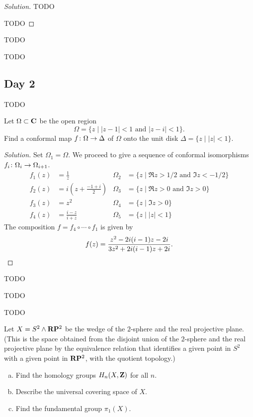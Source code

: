 \begin{proof}[Solution]
  TODO
  
  TODO
\end{proof}


TODO


TODO

\subsection{Day 2}
\label{S:fall-2008-2}
\mbox{}


TODO


Let $\Omega \subset \mathbf{C}$ be the open region
\[
\Omega = \{ z \;|\; |z-1| < 1 \textrm{ and } |z-i| < 1 \}.
\]
Find a conformal map $f \colon \Omega \rightarrow \Delta$ of $\Omega$ onto the unit disk $\Delta = \{ z \;|\; |z| < 1 \}$.

\begin{proof}[Solution]
  Set $\Omega_1 = \Omega$. We proceed to give a sequence of conformal isomorphisms $f_i \colon \Omega_i \rightarrow \Omega_{i+1}$.
  \begin{align*}
    f_1(z) &= \frac{1}{z} &
    \Omega_2 &= \{ z \;|\; \Re z > 1/2 \textrm{ and } \Im z < -1/2 \} \\
    f_2(z) &= i \left( z + \frac{-1 + i}{2} \right) &
    \Omega_3 &= \{ z \;|\; \Re z > 0 \textrm{ and } \Im z > 0 \} \\
    f_3(z) &= z^2 &
    \Omega_4 &= \{ z \;|\; \Im z > 0 \} \\
    f_4(z) &= \frac{i-z}{i+z} &
    \Omega_5 &= \{ z \;|\; |z| < 1 \}
  \end{align*}
  The composition $f = f_4 \circ \cdots \circ f_1$ is given by
  \[
  f(z) = \frac{z^2 - 2 i (i-1) z - 2 i}{3 z^2 + 2 i (i-1) z + 2 i}. \qedhere
  \]
\end{proof}


TODO


TODO


TODO


Let $X = S^2 \wedge \mathbf{R}\mathbf{P}^2$ be the wedge of the $2$-sphere and the real projective plane. (This is the space obtained from the disjoint union of the $2$-sphere and the real projective plane by the equivalence relation that identifies a given point in $S^2$ with a given point in $\mathbf{R}\mathbf{P}^2$, with the quotient topology.)
\begin{enumerate}[(a)]
\item Find the homology groups $H_n(X,\mathbf{Z})$ for all $n$.
\item Describe the universal covering space of $X$.
\item Find the fundamental group $\pi_1(X)$.
\end{enumerate}

